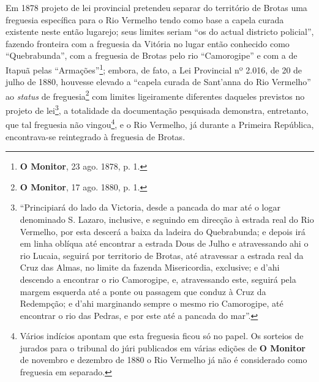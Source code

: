 Em 1878 projeto de lei provincial pretendeu separar do território de Brotas uma freguesia específica para o Rio Vermelho tendo como base a capela curada existente neste então lugarejo; seus limites seriam ``os do actual districto policial'', fazendo fronteira com a freguesia da Vitória no lugar então conhecido como ``Quebrabunda'', com a freguesia de Brotas pelo rio ``Camorogipe'' e com a de Itapuã pelas ``Armações''\footnote{\textbf{O Monitor}, 23 ago. 1878, p. 1.}; embora, de fato, a Lei Provincial nº 2.016, de 20 de julho de 1880, houvesse elevado a ``capela curada de Sant'anna do Rio Vermelho'' ao \textit{status} de freguesia\footnote{\textbf{O Monitor}, 17 ago. 1880, p. 1.} com limites ligeiramente diferentes daqueles previstos no projeto de lei\footnote{``Principiará do lado da Victoria, desde a pancada do mar até o logar denominado S. Lazaro, inclusive, e seguindo em direcção à estrada real do Rio Vermelho, por esta descerá a baixa da ladeira do Quebrabunda; e depois irá em linha oblíqua até encontrar a estrada Dous de Julho e atravessando ahi o rio Lucaia, seguirá por territorio de Brotas, até atravessar a estrada real da Cruz das Almas, no limite da fazenda Misericordia, exclusive; e d'ahi descendo a encontrar o rio Camorogipe, e, atravessando este, seguirá pela margem esquerda até a ponte ou passagem que conduz à Cruz da Redempção; e d'ahi marginando sempre o mesmo rio Camorogipe, até encontrar o rio das Pedras, e por este até a pancada do mar''.}, a totalidade da documentação pesquisada demonstra, entretanto, que tal freguesia não vingou\footnote{Vários indícios apontam que esta freguesia ficou só no papel. Os sorteios de jurados para o tribunal do júri publicados em várias edições de \textbf{O Monitor} de novembro e dezembro de 1880 o Rio Vermelho já não é considerado como freguesia em separado.}, e o Rio Vermelho, já durante a Primeira República, encontrava-se reintegrado à freguesia de Brotas.